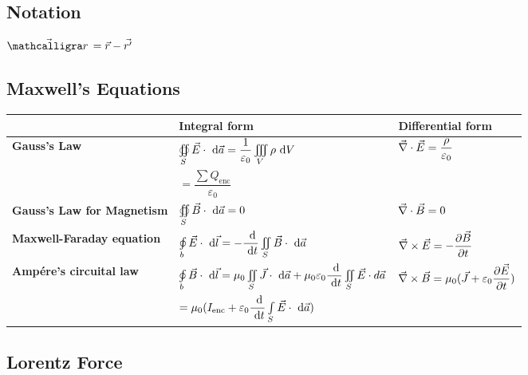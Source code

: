 		\subsection{Notation}
        \begin{itemize}
        \itemt \( \vec{\scriptr} = \vec{r} - \vec{r'} \)
        \end{itemize}

		\subsection{Maxwell's Equations}

\def\arraystretch{3}
\begin{tabular}{ |l|l|l| } 
\hline
					
  &	\textbf{Integral form}	& 	\textbf{Differential form}
\\ \hline

\textbf{Gauss's Law}	
&\( \oiint\limits_{S} \vec{E} \cdot \ \mathrm{d}\vec{a} = \dfrac{1}{\varepsilon_0} \iiint\limits_V \rho \ \mathrm{d}V \)	
& \( \vec{\nabla}\cdot \vec{E} = \dfrac{\rho}{\varepsilon_0} \)
\\
& \hspace{1.4cm}\( = \dfrac{\sum Q_\mathrm{enc}}{\varepsilon_0} \) &
\\ \hline

\textbf{Gauss's Law for Magnetism}	
&\( \oiint\limits_{S} \vec{B} \cdot \ \mathrm{d}\vec{a} = 0 \)
&\( \vec{\nabla}\cdot \vec{B} = 0 \)
\\ \hline

\textbf{Maxwell-Faraday equation}	
&\( \oint\limits_{b} \vec{E} \cdot \dn\vec{l} = -\dd{}{t} \iint\limits_S \vec{B} \cdot \dn\vec{a}\)	&\( \vec{\nabla}\times \vec{E} = -\dfrac{\partial \vec{B}}{\partial t} \)
\\ \hline

\textbf{Amp\'ere's circuital law}	
& \( \oint\limits_{b} \vec{B} \cdot \dn\vec{l} = \mu_0 \iint\limits_S \vec{J} \cdot \dn\vec{a} + \mu_0\varepsilon_0 \dd{}{t} \iint\limits_S \vec{E}\cdot d\vec{a}\)	
&\( \vec{\nabla}\times \vec{B} = \mu_0(\vec{J} + \varepsilon_0 \dfrac{\partial \vec{E}}{\partial t}) \)
\\
& \hspace{1.1cm} \( = \mu_0 (I_\mathrm{enc} + \varepsilon_0 \dd{}{t} \int\limits_S \vec{E} \cdot \dn\vec{a} ) \) &
\\ \hline
\end{tabular}


		\subsection{Lorentz Force}

